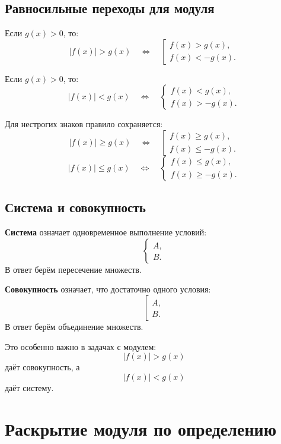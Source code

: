 \documentclass[a4paper,12pt]{article}
\newcommand{\important}[1]{\textcolor{darkaccent}{\textbf{#1}}}
\begin{document}
\subsection{Равносильные переходы для модуля}

Если \(g(x)>0\), то:
\[
    |f(x)|>g(x)
    \quad \Longleftrightarrow \quad
    \left[
    \begin{array}{l}
    f(x)>g(x),\\
    f(x)<-g(x).
    \end{array}
    \right.
\]

Если \(g(x)>0\), то:
\[
    |f(x)|<g(x)
    \quad \Longleftrightarrow \quad
    \begin{cases}
    f(x)<g(x),\\
    f(x)>-g(x).
    \end{cases}
\]

Для нестрогих знаков правило сохраняется:
\[
    |f(x)|\ge g(x)
    \quad \Longleftrightarrow \quad
    \left[
    \begin{array}{l}
    f(x)\ge g(x),\\
    f(x)\le -g(x).
    \end{array}
    \right.
\]
\[
    |f(x)|\le g(x)
    \quad \Longleftrightarrow \quad
    \begin{cases}
    f(x)\le g(x),\\
    f(x)\ge -g(x).
    \end{cases}
\]

\subsection{Система и совокупность}

\important{Система} означает одновременное выполнение условий:
\[
    \begin{cases}
    A,\\
    B.
    \end{cases}
\]
В ответ берём пересечение множеств.

\important{Совокупность} означает, что достаточно одного условия:
\[
    \left[
    \begin{array}{l}
    A,\\
    B.
    \end{array}
    \right.
\]
В ответ берём объединение множеств.

Это особенно важно в задачах с модулем:
\[
    |f(x)|>g(x)
\]
даёт совокупность, а
\[
    |f(x)|<g(x)
\]
даёт систему.

\section{Раскрытие модуля по определению}
\end{document}
